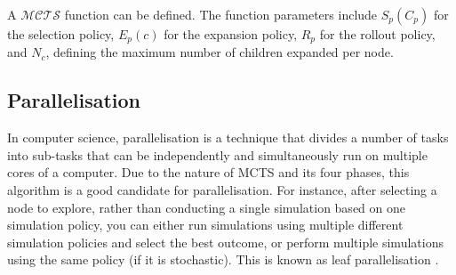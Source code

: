 A $\mathcal{MCTS}$ function can be defined. The function parameters include $S_p(C_p)$ for the selection policy, $E_p(c)$ for the expansion policy, $R_p$ for the rollout policy, and \(N_c\), defining the maximum number of children expanded per node.

\subsection{Parallelisation}

In computer science, parallelisation is a technique that divides a number of tasks into sub-tasks that can be independently and simultaneously run on multiple cores of a computer. Due to the nature of MCTS and its four phases, this algorithm is a good candidate for parallelisation. For instance, after selecting a node to explore, rather than conducting a single simulation based on one simulation policy, you can either run simulations using multiple different simulation policies and select the best outcome, or perform multiple simulations using the same policy (if it is stochastic). This is known as leaf parallelisation \cite{different_selection_policies}.

